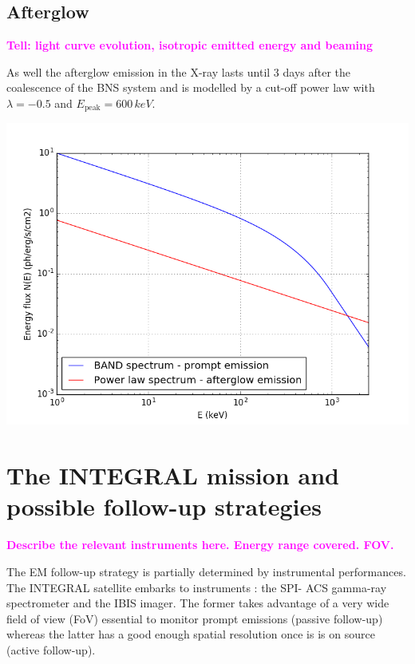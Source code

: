 \documentclass[a0,portrait]{a0poster}
\newcommand{\ECM}[1] {\textbf{\textcolor{magenta}{#1}}}
\begin{document}
\begin{multicols}{2}
\subsection*{Afterglow}

\ECM{Tell: light curve evolution, isotropic emitted energy and beaming}

As well the afterglow emission in the X-ray lasts until 3 days after the
coalescence of the BNS system and is modelled by a cut-off power law with
$\lambda = - 0.5$ and $E_{\mathrm{peak}} = 600 \, keV$. 


\begin{center}\vspace{.5cm}
    \includegraphics[width=20cm]{figures/spectra.png}
    \label{spectra}
\end{center}

\section*{The INTEGRAL mission and possible follow-up strategies}

\ECM{Describe the relevant instruments here. Energy range covered. FOV.}

The EM follow-up strategy is partially determined by instrumental
performances. The INTEGRAL satellite embarks to instruments : the SPI- ACS
gamma-ray spectrometer and the IBIS imager. The former takes advantage of a very
wide field of view (FoV) essential to monitor prompt emissions (passive
follow-up) whereas the latter has a good enough spatial resolution once is is on
source (active follow-up).


\end{multicols}
\end{document}
